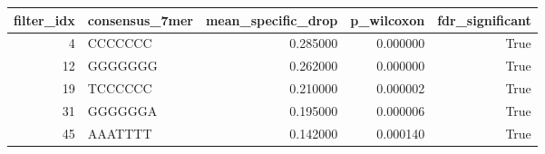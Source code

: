\begin{tabular}{rlrrr}
\toprule
filter_idx & consensus_7mer & mean_specific_drop & p_wilcoxon & fdr_significant \\
\midrule
4 & CCCCCCC & 0.285000 & 0.000000 & True \\
12 & GGGGGGG & 0.262000 & 0.000000 & True \\
19 & TCCCCCC & 0.210000 & 0.000002 & True \\
31 & GGGGGGA & 0.195000 & 0.000006 & True \\
45 & AAATTTT & 0.142000 & 0.000140 & True \\
\bottomrule
\end{tabular}
